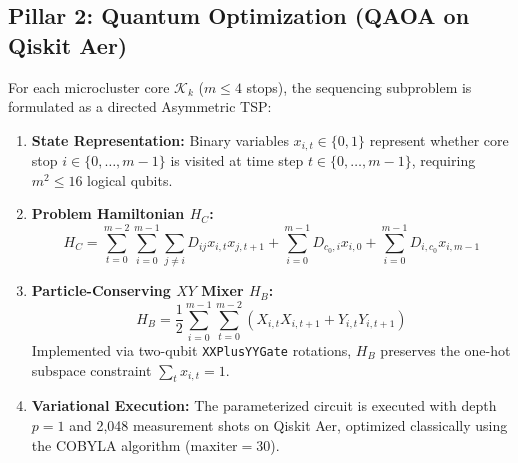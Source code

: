 \documentclass[journal,10pt]{IEEEtran}
\begin{document}
\subsection{Pillar 2: Quantum Optimization (QAOA on Qiskit Aer)}
For each microcluster core $\mathcal{K}_k$ ($m \le 4$ stops), the sequencing subproblem is formulated as a directed Asymmetric TSP:
\begin{enumerate}
    \item \textbf{State Representation:} Binary variables $x_{i, t} \in \{0, 1\}$ represent whether core stop $i \in \{0, \dots, m-1\}$ is visited at time step $t \in \{0, \dots, m-1\}$, requiring $m^2 \le 16$ logical qubits.
    \item \textbf{Problem Hamiltonian $H_C$:}
    \begin{equation}
    H_C = \sum_{t=0}^{m-2} \sum_{i=0}^{m-1} \sum_{j \ne i} D_{ij} x_{i, t} x_{j, t+1} + \sum_{i=0}^{m-1} D_{c_0, i} x_{i, 0} + \sum_{i=0}^{m-1} D_{i, c_0} x_{i, m-1}
    \end{equation}
    \item \textbf{Particle-Conserving $XY$ Mixer $H_B$:}
    \begin{equation}
    H_B = \frac{1}{2} \sum_{i=0}^{m-1} \sum_{t=0}^{m-2} \left( X_{i, t} X_{i, t+1} + Y_{i, t} Y_{i, t+1} \right)
    \end{equation}
    Implemented via two-qubit \texttt{XXPlusYYGate} rotations, $H_B$ preserves the one-hot subspace constraint $\sum_t x_{i, t} = 1$.
    \item \textbf{Variational Execution:} The parameterized circuit is executed with depth $p=1$ and 2,048 measurement shots on Qiskit Aer, optimized classically using the COBYLA algorithm ($\text{maxiter}=30$).
\end{enumerate}
\end{document}
